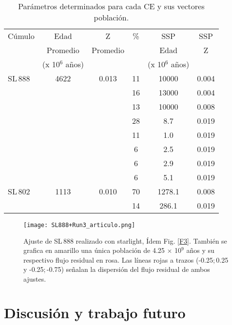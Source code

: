 \documentclass[baaa]{baaa}
\begin{document}
\begin{table*}[!t]
\centering
\caption{ Parámetros determinados para cada CE y sus vectores población.}
\begin{tabular}{lccccc}
\hline\hline\noalign{\smallskip}
\!\!Cúmulo & \!\!\!\!Edad& \!\!\!\!Z& \!\!\!\! \% &\!\!\!\! SSP &\!\!\!\! SSP \\
\!\! & \!\!\!\!Promedio& \!\!\!\!Promedio& \!\!\!\!  &\!\!\!\! Edad &\!\!\!\! Z \\
\!\! & \!\!\!\!(x 10$^{6}$ años)& \!\!\!\!& \!\!\!\! &\!\!\!\! (x 10$^{6}$ años) &\!\!\!\! \\
\hline\noalign{\smallskip}
\!\!SL\,888  & 4622& 0.013 & 11 & 10000 & 0.004\\
\!\!        &       &       & 16 & 13000 & 0.004\\
\!\!        &       &       & 13 & 10000 & 0.008\\
\!\!        &       &       & 28 & 8.7 & 0.019\\
\!\!        &       &       & 11 & 1.0 & 0.019\\
\!\!        &       &       & 6 & 2.5 & 0.019\\
\!\!        &       &       & 6 & 2.9 & 0.019\\
\!\!        &       &       & 6 & 5.1 & 0.019\\
\hline
\!\!SL\,802 & 1113 & 0.010 & 70 & 1278.1 & 0.008\\
\!\!        &       &       & 14 & 286.1 & 0.019 \\
\hline
\hline
\end{tabular}
\label{T1}
\end{table*}

\begin{figure*}[!ht]
\centering
\texttt{[image: SL888+Run3\_articulo.png]}
\caption{Ajuste de SL\,888 realizado con {\sc starlight}, Ídem Fig. \ref{F3}. También se grafica en amarillo una única población de 4.25 $\times$ 10$^{9}$ años y su respectivo flujo residual en rosa. Las líneas rojas a trazos (-0.25;\,0.25 y -0.25;\,-0.75) señalan la dispersión del flujo residual de ambos ajustes.}
\label{F4}
\end{figure*}

\section{Discusión y trabajo futuro}
\end{document}
